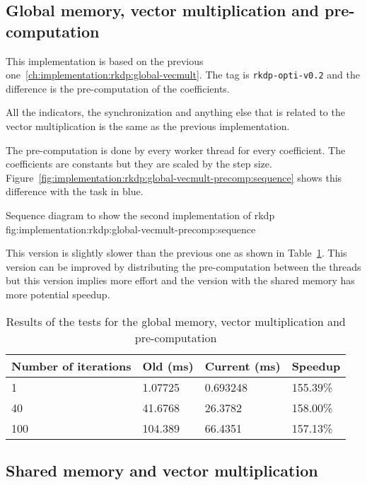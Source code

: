\subsection{Global memory, vector multiplication and pre-computation}
\label{ch:implementation:rkdp:global-vecmult-precomp}

This implementation is based on the previous one~\ref{ch:implementation:rkdp:global-vecmult}.
The tag is \texttt{rkdp-opti-v0.2} and the difference is the pre-computation of
the coefficients.

All the indicators, the synchronization and anything else that is related to the
vector multiplication is the same as the previous implementation.

The pre-computation is done by every worker thread for every coefficient.
The coefficients are constants but they are scaled by the step size.
Figure~\ref{fig:implementation:rkdp:global-vecmult-precomp:sequence} shows
this difference with the task in blue.

{Sequence diagram to show the second implementation of \acrshort{rkdp}}
{fig:implementation:rkdp:global-vecmult-precomp:sequence}

This version is slightly slower than the previous one as shown in
Table~\ref{tab:implementation:rkdp:global-vecmult-precomp:results}.
This version can be improved by distributing the pre-computation between the
threads but this version implies more effort and the version with the shared
memory has more potential speedup.

\begin{table}[ht]
    \centering
    \begin{tabular}{|l|l|l|l|}
        \hline
        \textbf{Number of iterations} & \textbf{Old (ms)} & \textbf{Current (ms)} & \textbf{Speedup} \\
        \hline
        1 & 1.07725 & 0.693248 & 155.39\% \\
        \hline
        40 & 41.6768 & 26.3782 & 158.00\% \\
        \hline
        100 & 104.389 & 66.4351 & 157.13\% \\
        \hline
    \end{tabular}
    \caption{Results of the tests for the global memory, vector multiplication and pre-computation}
    \label{tab:implementation:rkdp:global-vecmult-precomp:results}
\end{table}

\subsection{Shared memory and vector multiplication}
\label{ch:implementation:rkdp:shared-vecmult}

